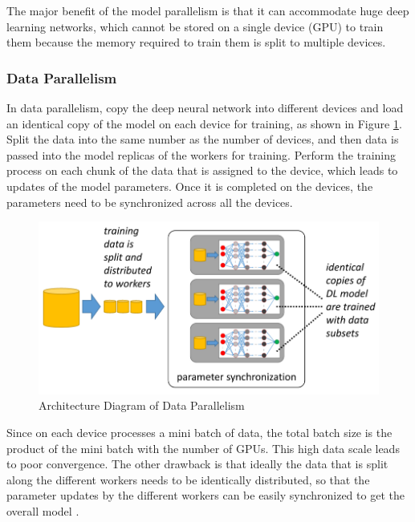 The major benefit of the model parallelism is that it can accommodate huge deep learning networks, which cannot be stored on a single device (GPU) to train them because the memory required to train them is split to multiple devices. 

\subsubsection{Data Parallelism}
In data parallelism, copy the deep neural network into different devices and load an identical copy of the model on each device for training, as shown in Figure \ref{fig:dataparallel}. Split the data into the same number as the number of devices, and then data is passed into the model replicas of the workers for training. Perform the training process on each chunk of the data that is assigned to the device, which leads to updates of the model parameters. Once it is completed on the devices, the parameters need to be synchronized across all the devices. 

\begin{figure}[ht]
  \begin{center}
    \includegraphics[width=\textwidth]{images/data parallelism.png} 
    \caption{Architecture Diagram of Data Parallelism  \cite{Mayer2020ScalableInfrastructures}}
    \label{fig:dataparallel}
  \end{center}
\end{figure}

Since on each device processes a mini batch of data, the total batch size is the product of the mini batch with the number of GPUs. This high data scale leads to poor convergence. The other drawback is that ideally the data that is split along the different workers needs to be identically distributed, so that the parameter updates by the different workers can be easily synchronized to get the overall model \cite{Jia2018BeyondNetworks}.

